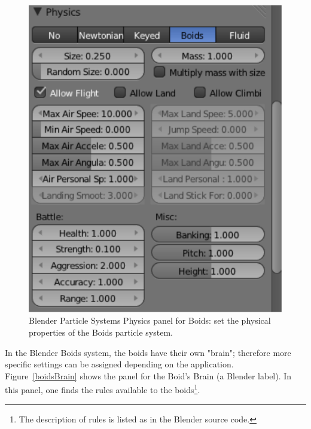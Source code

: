 \begin{figure}[htbp]
\begin{center}
\includegraphics[scale = 0.65]{figures/boidsPhysics.pdf} 
\caption{Blender Particle Systems Physics panel for Boids: set the physical properties of the Boids particle system.}
\label{boidsPhysics}
\end{center}
\end{figure}

In the Blender Boids system, the boids have their own "brain"; therefore more specific settings can be assigned depending on the application. Figure~\ref{boidsBrain} shows the panel for the Boid's Brain (a Blender label). In this panel, one finds the rules available to the boids\footnote{The description of rules is listed as in the Blender source code.}.

